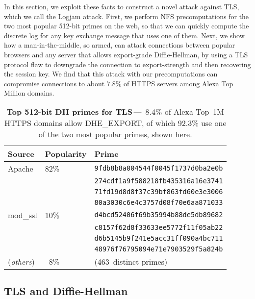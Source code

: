 In this section, we exploit these facts to construct a novel attack against
TLS\@, which we call the Logjam attack. First, we perform NFS precomputations
for the two most popular 512-bit primes on the web, so that we can quickly
compute the discrete log for any key exchange message that uses one of them.
Next, we show how a man-in-the-middle, so armed, can attack connections
between popular browsers and any server that allows export-grade
Diffie-Hellman, by using a TLS protocol flaw to downgrade the connection to
export-strength and then recovering the session key. We find that this attack
with our precomputations can compromise connections to about 7.8\% of HTTPS
servers among Alexa Top Million domains.

\def\AData{\texttt{Data}\xspace}
\def\dhe{\textsf{\small DHE}\xspace}
\def\ecdhe{\textsf{\small ECDHE}\xspace}
\def\dheexp{\textsf{\small DHE\_EXPORT}\xspace}

\begin{table}[t]
	\centering\small
	\begin{tabular}{lll}
          \toprule
          Source  & Popularity & Prime \\
          \midrule
          Apache   & 82\% & \tt 9fdb8b8a004544f0045f1737d0ba2e0b\\
                   &      & \tt 274cdf1a9f588218fb435316a16e3741\\
                   &      & \tt 71fd19d8d8f37c39bf863fd60e3e3006\\
                   &      & \tt 80a3030c6e4c3757d08f70e6aa871033\smallskip\\
          mod\_ssl & 10\% & \tt d4bcd52406f69b35994b88de5db89682\\
                   &      & \tt c8157f62d8f33633ee5772f11f05ab22\\
                   &      & \tt d6b5145b9f241e5acc31ff090a4bc711\\
                   &      & \tt 48976f76795094e71e7903529f5a824b\smallskip\\
          (\emph{others\/}) & \ 8\% & (463~distinct primes) \\
          \bottomrule
	\end{tabular}
    \caption{\textbf{Top 512-bit DH primes for TLS}\,---\,%
        8.4\% of Alexa Top~1M HTTPS domains allow \dheexp{}, of which 92.3\% use
        one of the two most popular primes, shown here.
    }
    \label{tab:export-primes}
\end{table}

\subsection{TLS and Diffie-Hellman}

